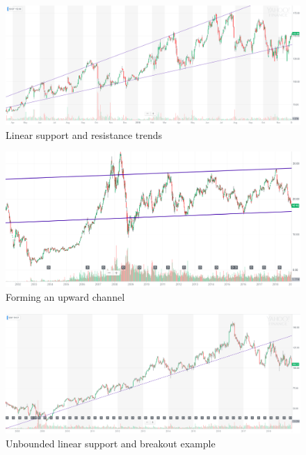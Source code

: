 \documentclass{article}
\begin{document}
\begin{figure}[!htb]
    \centering
    \includegraphics[width=\textwidth]{imgs/42.png}
    \caption{Linear support and resistance trends}
\end{figure}

\vspace{10pt}

\begin{figure}[!htb]
    \centering
    \includegraphics[width=\textwidth]{imgs/43.png}
    \caption{Forming an upward channel}
\end{figure}

\vspace{10pt}

\begin{figure}[!htb]
    \centering
    \includegraphics[width=\textwidth]{imgs/44.png}
    \caption{Unbounded linear support and breakout example}
\end{figure}
\end{document}
